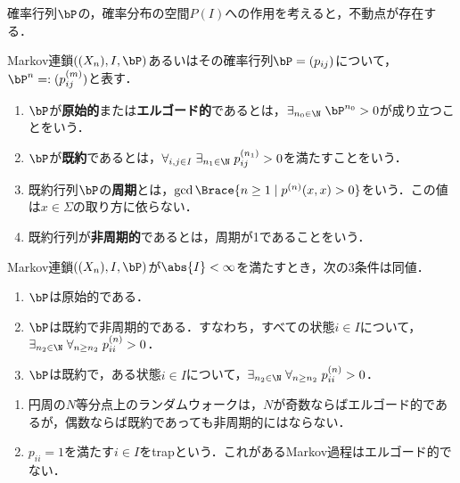 \documentclass[uplatex,dvipdfmx]{jsreport}
\begin{document}
\begin{tcolorbox}[colframe=ForestGreen, colback=ForestGreen!10!white,breakable,colbacktitle=ForestGreen!40!white,coltitle=black,fonttitle=\bfseries\sffamily,
title=]
    確率行列$\bP$の，確率分布の空間$P(I)$への作用を考えると，不動点が存在する．
\end{tcolorbox}

\begin{definition}
    Markov連鎖$((X_n),I,\bP)$あるいはその確率行列$\bP=(p_{ij})$について，$\bP^n=:(p_{ij}^{(m)})$と表す．
    \begin{enumerate}
        \item $\bP$が\textbf{原始的}または\textbf{エルゴード的}であるとは，$\exists_{n_0\in\N}\;\bP^{n_0}>0$が成り立つことをいう．
        \item $\bP$が\textbf{既約}であるとは，$\forall_{i,j\in I}\;\exists_{n_1\in\N}\;p_{ij}^{(n_1)}>0$を満たすことをいう．
        \item 既約行列$\bP$の\textbf{周期}とは，$\gcd\Brace{n\ge1\mid p^{(n)}(x,x)>0}$をいう．この値は$x\in\Sigma$の取り方に依らない．
        \item 既約行列が\textbf{非周期的}であるとは，周期が1であることをいう．
    \end{enumerate}
\end{definition}

\begin{lemma}[エルゴード性の特徴付け]
    Markov連鎖$((X_n),I,\bP)$が$\abs{I}<\infty$を満たすとき，次の3条件は同値．
    \begin{enumerate}
        \item $\bP$は原始的である．
        \item $\bP$は既約で非周期的である．すなわち，すべての状態$i\in I$について，$\exists_{n_2\in\N}\;\forall_{n\ge n_2}\;p_{ii}^{(n)}>0$．
        \item $\bP$は既約で，ある状態$i\in I$について，$\exists_{n_2\in\N}\;\forall_{n\ge n_2}\;p_{ii}^{(n)}>0$．
    \end{enumerate}
\end{lemma}

\begin{example}\mbox{}
    \begin{enumerate}
        \item 円周の$N$等分点上のランダムウォークは，$N$が奇数ならばエルゴード的であるが，偶数ならば既約であっても非周期的にはならない．
        \item $p_{ii}=1$を満たす$i\in I$をtrapという．これがあるMarkov過程はエルゴード的でない．
    \end{enumerate}
\end{example}
\end{document}
